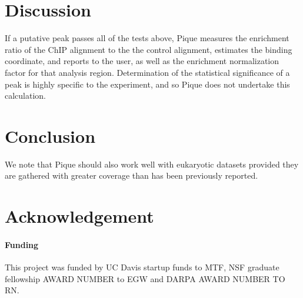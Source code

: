 \documentclass{bioinfo}
\begin{document}
\section{Discussion}

\noindent If a putative peak passes all of the tests above, Pique
measures the enrichment ratio of the ChIP alignment to the the control
alignment, estimates the binding coordinate, and reports to the user,
as well as the enrichment normalization factor for that analysis
region. Determination of the statistical significance of a peak is
highly specific to the experiment, and so Pique does not undertake
this calculation.

\section{Conclusion}

We note that Pique should also work well with eukaryotic datasets
provided they are gathered with greater coverage than has been
previously reported.

\section*{Acknowledgement}
\paragraph{Funding\textcolon} 

This project was funded by UC Davis startup funds to MTF, NSF graduate
fellowship AWARD NUMBER to EGW and DARPA AWARD NUMBER TO RN.

%
%
%
%
%




\end{document}

